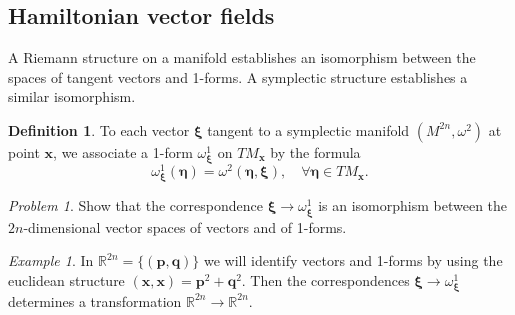 \documentclass{book}
\numberwithin{equation}{section}
\theoremstyle{plain}
\theoremstyle{definition}
\newtheorem*{defn*}{Definition}
\theoremstyle{remark}
\theoremstyle{smallcap}
\newtheorem*{ex*}{Example}
\newtheorem*{prob*}{Problem}
\numberwithin{prob}{section}
\begin{document}
\subsection{Hamiltonian vector fields}



A Riemann structure on a manifold establishes an isomorphism between
the spaces of tangent vectors and 1-forms.
%
A symplectic structure establishes a similar isomorphism.


\begin{defn*}
%
To each vector $\pmb \xi$
tangent to a symplectic manifold $(M^{2n}, \omega^2)$
at point $\mathbf x$, we associate a 1-form $\omega^1_{\pmb \xi}$
on $TM_{\mathbf x}$ by the formula
$$
\omega^1_{\pmb \xi}(\pmb \eta) = \omega^2(\pmb \eta, \pmb \xi),
\quad \forall \pmb \eta \in TM_{\mathbf x}.
$$
\end{defn*}

\begin{prob*}
Show that the correspondence $\pmb \xi \rightarrow \omega^1_{\mathbf \xi}$
is an isomorphism between the $2n$-dimensional vector spaces of vectors
and of 1-forms.
\end{prob*}

\begin{ex*}
  In $\mathbb{R}^{2n}=\{(\mathbf p, \mathbf q)\}$
  we will identify vectors and 1-forms by using the euclidean structure
  $(\mathbf x, \mathbf x) = \mathbf p^2 + \mathbf q^2$.
  Then the correspondences $\pmb\xi \rightarrow \omega^1_{\pmb\xi}$
  determines a transformation
  $\mathbb{R}^{2n} \rightarrow \mathbb{R}^{2n}$.
\end{ex*}
\end{document}
